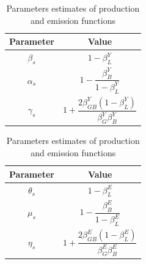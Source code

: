 \documentclass[11pt]{article}
\begin{document}
\begin{table}[http]
    \centering
    \caption{\quad Parameters estimates of production and emission functions} \label{tab:estimate_parameters}
    \begin{tabular}{cc}
        \hline
        \textbf{Parameter} & \textbf{Value} \\
        \hline
        $\beta_{s}$ & $1-\beta_L^Y$ \vspace{5pt}
        \\
        $\alpha_{s}$ & $1-\dfrac{\beta_B^Y}{1-\beta_L^Y}$ \vspace{5pt}
        \\
        $\gamma_{s}$ & $1+\dfrac{2\beta_{GB}^Y(1-\beta_L^Y)}{\beta_G^Y\beta_B^Y}$ \vspace{5pt}
        \\
        \hline
    \end{tabular}
    \hspace{1cm}
    \begin{tabular}{cc}
      \hline
      \textbf{Parameter} & \textbf{Value} \\
      \hline
      $\theta_{s}$ & $1-\beta_L^E$ \vspace{5pt}
      \\
      $\mu_{s}$ & $1-\dfrac{\beta_B^E}{1-\beta_L^E}$ \vspace{5pt}
      \\
      $\eta_{s}$ & $1+\dfrac{2\beta_{GB}^E(1-\beta_L^E)}{\beta_G^E\beta_B^E}$ \vspace{5pt}
      \\
      \hline
  \end{tabular}
\end{table}




\clearpage


\begin{doublespacing}   %


\end{doublespacing}

\clearpage

\renewcommand{\enotesize}{\normalsize}
\begin{doublespacing}
  \theendnotes
\end{doublespacing}

\clearpage
\end{document}
